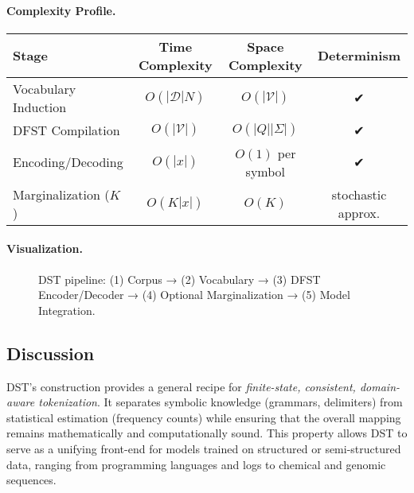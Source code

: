 \paragraph{Complexity Profile.}
\begin{center}
\begin{tabular}{lccc}
\toprule
Stage & Time Complexity & Space Complexity & Determinism \\
\midrule
Vocabulary Induction & $O(|\mathcal{D}|N)$ & $O(|\mathcal{V}|)$ & ✔ \\
DFST Compilation & $O(|\mathcal{V}|)$ & $O(|Q||\Sigma|)$ & ✔ \\
Encoding/Decoding & $O(|x|)$ & $O(1)$ per symbol & ✔ \\
Marginalization ($K$) & $O(K|x|)$ & $O(K)$ & stochastic approx. \\
\bottomrule
\end{tabular}
\end{center}

\paragraph{Visualization.}
\begin{figure}[h]
\centering
\caption{DST pipeline: (1) Corpus → (2) Vocabulary → (3) DFST Encoder/Decoder → (4) Optional Marginalization → (5) Model Integration.}
\label{fig:dst_pipeline}
\end{figure}

\subsection{Discussion}
DST’s construction provides a general recipe for
\emph{finite-state, consistent, domain-aware tokenization}.
It separates symbolic knowledge (grammars, delimiters)
from statistical estimation (frequency counts)
while ensuring that the overall mapping
remains mathematically and computationally sound.
This property allows DST to serve as
a unifying front-end for models trained on
structured or semi-structured data,
ranging from programming languages and logs
to chemical and genomic sequences.
